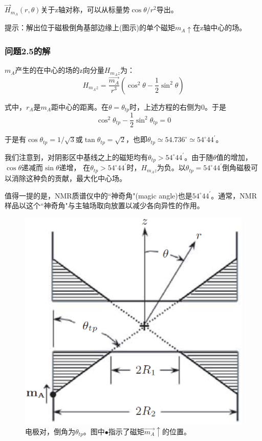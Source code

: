 $\vec{H}_{m_A}(r,\theta)$关于z轴对称，可以从标量势$\cos\theta/r^2$导出。

提示：解出位于磁极倒角基部边缘上(图示)的单个磁矩$m_A \uparrow$在z轴中心的场。

\subsubsection*{问题2.5的解}
$m_A$产生的在中心的场的z向分量$H_{m_A z}$为：
\begin{equation*}
H_{m_A z}=\frac{\vec{m_A}}{r^3}(\cos^2\theta-\frac{1}{2}\sin^2\theta) \tag{S5.1}
\end{equation*}

式中，$r_A$是$m_A$距中心的距离。在$\theta=\theta_{tp}$时，上述方程的右侧为0。于是
\begin{equation*}
\cos^2\theta_{tp}-\frac{1}{2}\sin^2\theta_{tp}=0 \tag{S5.2}
\end{equation*}

于是有$\cos\theta_{tp}=1/\sqrt{3}$或$\tan\theta_{tp}=\sqrt{2}$，也即$\theta_{tp}\simeq 54.736^\circ\simeq54^\circ 44^\prime$。

我们注意到，对阴影区中基线之上的磁矩均有$\theta_{tp}>54^\circ 44^\prime$。由于随$\theta$值的增加，$\cos\theta$递减而$\sin\theta$递增，
在$\theta_{tp}>54^\circ 44^\prime$时，$H_{m_A z}$为负。以$\theta_{tp}=54^\circ 44^\prime$倒角磁极可以消除这种负的贡献，最大化中心场。

值得一提的是，NMR质谱仪中的``神奇角"(magic angle)也是$54^\circ 44^\prime$。通常，NMR样品以这个``神奇角"与主轴场取向放置以减少各向异性的作用。

\begin{figure}[htbp]
  \centering
 \includegraphics[scale=0.3]{chpt2/figs/fig2.8.eps}
  \caption{电极对，倒角为$\theta_{tp}$。图中$\bullet$指示了磁矩$\vec{m_A}\uparrow$的位置。}
\end{figure}




